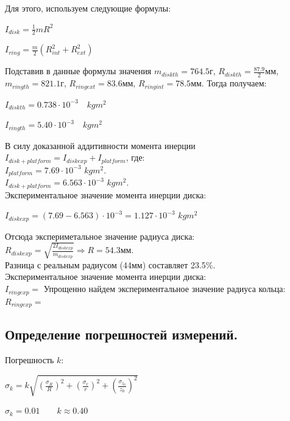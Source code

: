 \documentclass[12pt,a4paper]{article}
\begin{document}
		Для этого, используем следующие формулы:
		
		\newpage
		
		\begin{flushleft}
			\begin{spacing}{1.6}
				$ I_{disk} = \frac{1}{2}mR^2 $
				
				$ I_{ring} = \frac{m}{2}(R_{int}^2 + R_{ext}^2)$
			\end{spacing}
		\end{flushleft}
		
		Подставив в данные формулы значения $ m_{disk th}=764.5$г, $ R_{disk th}=\frac{87.9}{2} $мм, $ m_{ring th}=821.1$г, $ R_{ring ext}=83.6$мм, $R_{ring int}=78.5$мм. Тогда получаем:		
		
		\begin{flushleft}
			\begin{spacing}{1.6}
				$ I_{disk th} =0.738 \cdot 10^{-3}  \quad kgm^2 $
				
				$ I_{ring th} =5.40 \cdot 10^{-3}  \quad kgm^2 $
			\end{spacing}
		\end{flushleft}

В силу доказанной аддитивности момента инерции $I_{disk+platform}=I_{disk exp}+I_{platform}$, где:\\
$I_{platform}=7.69\cdot 10^{-3}$ $kgm^2$.\\
$I_{disk+platform}=6.563\cdot 10^{-3}$ $kgm^2$.\\
Экспериментальное значение момента инерции диска:\\
\begin{spacing}{1.6}
$I_{disk exp}=(7.69-6.563)\cdot10^{-3}=1.127\cdot10^{-3}$ $kgm^2$
\end{spacing}
Отсюда экспериметальное значение радиуса диска: $R_{disk exp}=\sqrt{\frac{2I_{disk exp}}{m_{disk exp}}}\Rightarrow R=54.3$мм.\\
Разница с реальным радиусом (44мм) составляет 23.5\%.\\

Экспериментальное значение момента инерции диска:\\
$I_{ring exp}=$
Упрощенно найдем экспериментальное значение радиуса кольца:\\
$R_{ring exp}=$

      \subsection{Определение погрешностей измерений.}	 
Погрешность $k$:
\begin{flushleft}
			\begin{spacing}{1.4}
				$ \sigma_{k} = k\sqrt{\left(\frac{\sigma_{R}}{R}\right)^2 + \left(\frac{\sigma_{r}}{r}\right)^2 + \left(\frac{\sigma_{z_{0}}}{z_{0}}\right)^2} $
			
				$ \sigma_{k} = 0.01\qquad k \approx 0.40$
			\end{spacing} 
		\end{flushleft}
		
\end{document}
